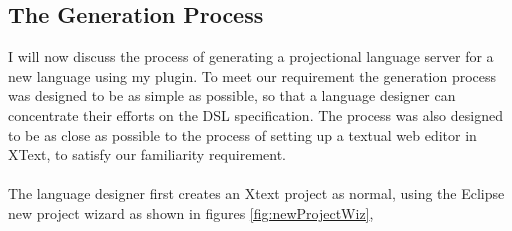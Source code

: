 \documentclass{article}
\begin{document}
\subsection{The Generation Process}
I will now discuss the process of generating a projectional language server for a new language using my plugin. To meet our \RSetup requirement the generation process was designed to be as simple as possible, so that a language designer can concentrate their efforts on the DSL specification. The process was also designed to be as close as possible to the process of setting up a textual web editor in XText, to satisfy our familiarity \RFamiliarity requirement.
\\
\\
The language designer first creates an Xtext project as normal, using the Eclipse new project wizard as shown in figures \ref{fig:newProjectWiz},
\end{document}

